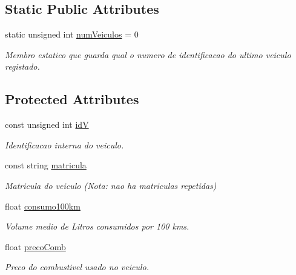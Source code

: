 \subsection*{Static Public Attributes}
\begin{DoxyCompactItemize}
\item 
\mbox{\label{class_veiculo_a5f4ef3639e6968b83bd3eee911168de4}} 
static unsigned int \mbox{\hyperlink{class_veiculo_a5f4ef3639e6968b83bd3eee911168de4}{num\+Veiculos}} = 0
\begin{DoxyCompactList}\small\item\em Membro estatico que guarda qual o numero de identificacao do ultimo veiculo registado. \end{DoxyCompactList}\end{DoxyCompactItemize}
\subsection*{Protected Attributes}
\begin{DoxyCompactItemize}
\item 
\mbox{\label{class_veiculo_a62ec1732abcd9b6eb6a1bc80b6f28ead}} 
const unsigned int \mbox{\hyperlink{class_veiculo_a62ec1732abcd9b6eb6a1bc80b6f28ead}{idV}}
\begin{DoxyCompactList}\small\item\em Identificacao interna do veiculo. \end{DoxyCompactList}\item 
\mbox{\label{class_veiculo_ad9cd698bf39e90508cd0700ee3b9d90b}} 
const string \mbox{\hyperlink{class_veiculo_ad9cd698bf39e90508cd0700ee3b9d90b}{matricula}}
\begin{DoxyCompactList}\small\item\em Matricula do veiculo (Nota\+: nao ha matriculas repetidas) \end{DoxyCompactList}\item 
\mbox{\label{class_veiculo_a06533b15de432c2d6ee86057d35dc547}} 
float \mbox{\hyperlink{class_veiculo_a06533b15de432c2d6ee86057d35dc547}{consumo100km}}
\begin{DoxyCompactList}\small\item\em Volume medio de Litros consumidos por 100 kms. \end{DoxyCompactList}\item 
\mbox{\label{class_veiculo_a1b3f7e8c716e8fd68ec7c7405f18c1ef}} 
float \mbox{\hyperlink{class_veiculo_a1b3f7e8c716e8fd68ec7c7405f18c1ef}{preco\+Comb}}
\begin{DoxyCompactList}\small\item\em Preco do combustivel usado no veiculo. \end{DoxyCompactList}\end{DoxyCompactItemize}
